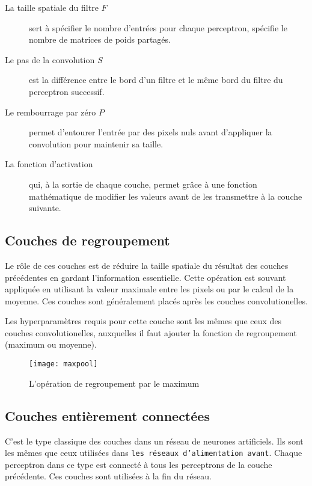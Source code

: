 \begin{description}
  \item[La taille spatiale du filtre $F$] sert à
  spécifier le nombre d'entrées pour chaque perceptron,
   spécifie
  le nombre de matrices de poids partagés.
  \item[Le pas de la convolution $S$] est la différence entre le bord d'un
  filtre et le même bord du filtre du perceptron successif.
  \item[Le rembourrage par zéro $P$] permet d'entourer
  l'entrée par des pixels nuls avant d'appliquer la convolution pour maintenir
  sa taille.
  \item[La fonction d'activation] qui, à la sortie de chaque couche, permet grâce
  à une fonction mathématique de modifier les valeurs avant de les transmettre à la
  couche suivante.
\end{description}

\subsection{Couches de regroupement}

Le rôle de ces couches est de réduire la taille spatiale du résultat des couches
précédentes en gardant l'information essentielle. Cette opération est souvant
appliquée en utilisant la valeur maximale entre les pixels ou par le calcul de
la moyenne. Ces couches sont généralement placés après les couches
convolutionelles.

Les hyperparamètres requis pour cette couche sont les mêmes que ceux des couches
convolutionelles, auxquelles il faut ajouter la fonction de regroupement
(maximum ou moyenne).

\begin{figure}[h]
\begin{center}
\texttt{[image: maxpool]}
\caption{L'opération de regroupement par le maximum}{\cite{karpathy2016cs231n}}
\end{center}
\end{figure}

\subsection{Couches entièrement connectées}

C'est le type classique des couches dans un réseau de neurones artificiels. Ils
sont les mêmes que ceux utilisées dans \texttt{les réseaux d'alimentation avant}.
Chaque perceptron dans ce type est connecté à tous les perceptrons de la couche
précédente. Ces couches sont utilisées à la fin du réseau.

